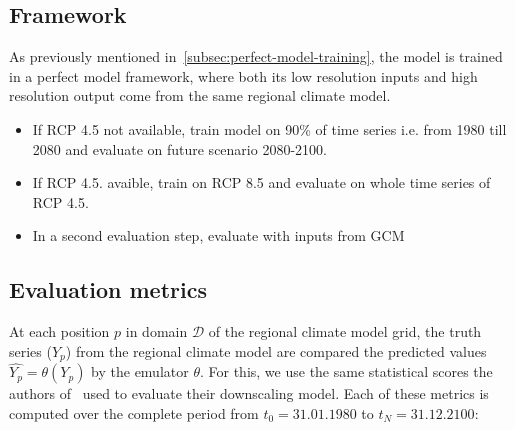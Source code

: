 \documentclass[a4paper,11pt,oneside]{report}
\begin{document}
\subsection{Framework}\label{subsec:evaluation-framework}
As previously mentioned in~\ref{subsec:perfect-model-training}, the model is trained in a perfect model framework, where both its low resolution inputs and high resolution output come from the same regional climate model.
\begin{itemize}
\item If RCP 4.5 not available, train model on 90\% of time series i.e. from 1980 till 2080 and evaluate on future scenario 2080-2100. 
    \item If RCP 4.5. avaible, train on RCP 8.5 and evaluate on whole time series of RCP 4.5.
    \item In a second evaluation step, evaluate with inputs from GCM 
\end{itemize}


\subsection{Evaluation metrics}\label{subsec:evaluation-metrics}
At each position $p$ in domain $\mathcal{D} $ of the regional climate model grid, the truth series ($Y_{p}$) from the regional climate model are compared the predicted values $\widehat{Y_{p}}= \theta(Y_{p})$ by the emulator $\theta$. For this, we use the same statistical scores the authors of~\cite{Doury} used to evaluate their downscaling model. Each of these metrics is computed over the complete period from $t_{0}=31.01.1980$ to $t_{N}=31.12.2100$:
\end{document}
